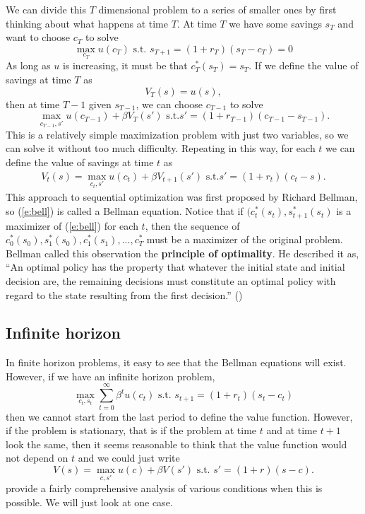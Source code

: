 We can divide this $T$ dimensional problem to a
series of smaller ones by first thinking about what happens at time
$T$. At time $T$ we have some savings $s_T$ and want to choose $c_T$
to solve
\[ \max_{c_T} u(c_T) \text{ s.t. } s_{T+1} = (1+r_T)(s_T -c_T) = 0 \]
As long as $u$ is increasing, it must be that $c_T^*(s_T) = s_T$. If
we define the value of savings at time $T$ as
\[ V_T(s) = u(s), \]
then at time $T-1$ given $s_{T-1}$, we can choose $c_{T-1}$ to solve
\[ \max_{c_{T-1},s'} u(c_{T-1}) + \beta V_T(s') \text{ s.t.} s' =
  (1+r_{T-1})(c_{T-1}-s_{T-1}). \]
This is a relatively simple maximization problem with just two
variables, so we can solve it without too much difficulty. Repeating
in this way, for each $t$ we can define the value of savings at time
$t$ as
\begin{align} 
  V_t(s) = \max_{c_t,s'} u(c_{t}) + \beta V_{t+1}(s') \text{ s.t.} s' =
  (1+r_{t})(c_{t}-s). \label{e:bell}
\end{align}
This approach to sequential optimization was first proposed by Richard
Bellman, so (\ref{e:bell}) is called a Bellman equation. Notice that
if $(c_t^*(s_t),s_{t+1}^*(s_t)$ is a maximizer of (\ref{e:bell}) for
each $t$, then 
the sequence of $c_0^*(s_0),s_1^*(s_0), c_1^*(s_1), ..., c_T^*$ must
be a maximizer of the original problem. Bellman called this
observation the \textbf{principle of optimality}. He described it as,
``An optimal policy has the property that whatever the initial state
and initial decision are, the remaining decisions must constitute an
optimal policy with regard to the state resulting from the first
decision.'' (\cite{bellman1962})

\subsection{Infinite horizon}
In finite horizon problems, it easy to see that the
Bellman equations will exist. However, if we have an infinite horizon
problem, 
\[ \max_{c_t,s_t} \sum_{t=0}^\infty \beta^t u(c_t) \text{ s.t. } s_{t+1} =
(1+r_t) (s_t - c_t) \]
then we cannot start from the last period to define the value
function. However, if the problem is stationary, that is if the
problem at time $t$ and at time $t+1$ look the same, then it seems
reasonable to think that the value function would not depend on $t$
and we could just write 
\[ V(s) = \max_{c,s'} u(c) + \beta V(s') \text{ s.t. } s' =
(1+r)(s-c). \]
\cite{stokey1989} provide a fairly comprehensive analysis of
various conditions when this is possible. We will just look at one
case. 

